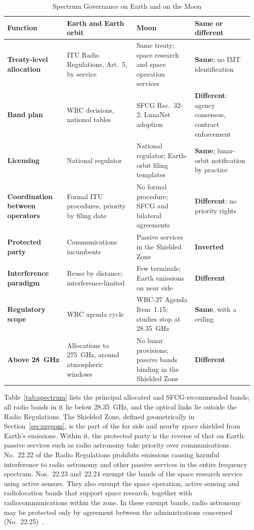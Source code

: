 \documentclass{IEEEoj}
\begin{document}
\begin{table}[!t]
\caption{Spectrum Governance on Earth and on the Moon}
\label{tab:governance}
\centering
\footnotesize
\begin{tabularx}{\textwidth}{@{}>{\raggedright\arraybackslash\bfseries}p{3.1cm}>{\raggedright\arraybackslash}p{4.6cm}>{\raggedright\arraybackslash}p{5.2cm}>{\raggedright\arraybackslash}X}
\toprule
\rowcolor{tabhead}\textbf{Function} & \textbf{Earth and Earth orbit} & \textbf{Moon} & \textbf{Same or different} \\
\midrule
Treaty-level allocation & ITU Radio Regulations, Art.~5, by service & Same treaty; space research and space operation services & \textbf{Same}; no IMT identification \\
Band plan & WRC decisions, national tables & SFCG Rec.~32-2; LunaNet adoption & \textbf{Different}: agency consensus, contract enforcement \\
Licensing & National regulator & National regulator; Earth-orbit filing templates & \textbf{Same}; lunar-orbit notification by practice \\
Coordination between operators & Formal ITU procedures, priority by filing date & No formal procedure; SFCG and bilateral agreements & \textbf{Different}: no priority rights \\
Protected party & Communications incumbents & Passive services in the Shielded Zone & \textbf{Inverted} \\
Interference paradigm & Reuse by distance; interference-limited & Few terminals; Earth emissions on near side & \textbf{Different} \\
Regulatory scope & WRC agenda cycle & WRC-27 Agenda Item~1.15; studies stop at \SI{28.35}{GHz} & \textbf{Same}, with a ceiling \\
Above \SI{28}{GHz} & Allocations to \SI{275}{GHz}, around atmospheric windows & No lunar provisions; passive bands binding in the Shielded Zone & \textbf{Different} \\
\bottomrule
\end{tabularx}
\end{table}

Table~\ref{tab:spectrum} lists the principal allocated and SFCG-recommended bands; all radio bands in it lie below \SI{28.35}{GHz}, and the optical links lie outside the Radio Regulations. The Shielded Zone, defined geometrically in Section~\ref{sec:szgeom}, is the part of the far side and nearby space shielded from Earth's emissions. Within it, the protected party is the reverse of that on Earth: passive services such as radio astronomy take priority over communications. No.~22.22 of the Radio Regulations prohibits emissions causing harmful interference to radio astronomy and other passive services in the entire frequency spectrum. Nos.~22.23 and~22.24 exempt the bands of the space research service using active sensors. They also exempt the space operation, active sensing and radiolocation bands that support space research, together with radiocommunications within the zone. In these exempt bands, radio astronomy may be protected only by agreement between the administrations concerned (No.~22.25)~\cite{itu_rr2024}.
\end{document}
